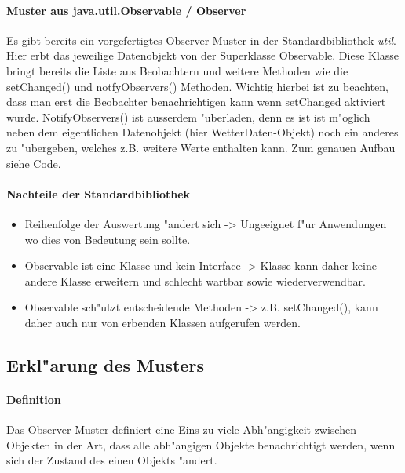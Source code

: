 \paragraph{Muster aus java.util.Observable / Observer}
Es gibt bereits ein vorgefertigtes Observer-Muster in der Standardbibliothek \emph{util}. Hier erbt das 
jeweilige Datenobjekt von der Superklasse Observable. Diese Klasse bringt bereits die Liste aus 
Beobachtern und weitere Methoden wie die setChanged() und notfyObservers() Methoden. Wichtig 
hierbei ist zu beachten, dass man erst die Beobachter benachrichtigen kann wenn setChanged 
aktiviert wurde. NotifyObservers() ist ausserdem "uberladen, denn es ist ist m"oglich neben dem 
eigentlichen Datenobjekt (hier WetterDaten-Objekt) noch ein anderes zu "ubergeben, welches z.B. 
weitere Werte enthalten kann. 
Zum genauen Aufbau siehe Code.

\begin{samepage}
\paragraph{Nachteile der Standardbibliothek}
\begin{itemize}
\item Reihenfolge der Auswertung "andert sich -> Ungeeignet f"ur Anwendungen wo dies von Bedeutung 
  sein sollte.
\item Observable ist eine Klasse und kein Interface -> Klasse kann daher keine andere Klasse 
  erweitern und schlecht wartbar sowie wiederverwendbar.
\item Observable sch"utzt entscheidende Methoden -> z.B. setChanged(), kann daher auch nur von 
  erbenden Klassen aufgerufen werden.
\end{itemize}
\end{samepage}

\subsection{Erkl"arung des Musters}
\paragraph{Definition}
Das Observer-Muster definiert eine Eins-zu-viele-Abh"angigkeit zwischen Objekten in der Art, dass 
alle abh"angigen Objekte benachrichtigt werden, wenn sich der Zustand des einen Objekts "andert. 

